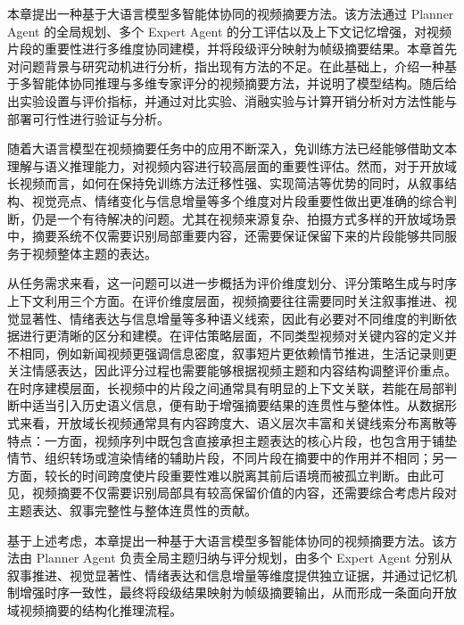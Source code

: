 

本章提出一种基于大语言模型多智能体协同的视频摘要方法。该方法通过 Planner Agent 的全局规划、多个 Expert Agent 的分工评估以及上下文记忆增强，对视频片段的重要性进行多维度协同建模，并将段级评分映射为帧级摘要结果。本章首先对问题背景与研究动机进行分析，指出现有方法的不足。在此基础上，介绍一种基于多智能体协同推理与多维专家评分的视频摘要方法，并说明了模型结构。随后给出实验设置与评价指标，并通过对比实验、消融实验与计算开销分析对方法性能与部署可行性进行验证与分析。


随着大语言模型在视频摘要任务中的应用不断深入，免训练方法已经能够借助文本理解与语义推理能力，对视频内容进行较高层面的重要性评估。然而，对于开放域长视频而言，如何在保持免训练方法迁移性强、实现简洁等优势的同时，从叙事结构、视觉亮点、情绪变化与信息增量等多个维度对片段重要性做出更准确的综合判断，仍是一个有待解决的问题。尤其在视频来源复杂、拍摄方式多样的开放域场景中，摘要系统不仅需要识别局部重要内容，还需要保证保留下来的片段能够共同服务于视频整体主题的表达。

从任务需求来看，这一问题可以进一步概括为评价维度划分、评分策略生成与时序上下文利用三个方面。在评价维度层面，视频摘要往往需要同时关注叙事推进、视觉显著性、情绪表达与信息增量等多种语义线索，因此有必要对不同维度的判断依据进行更清晰的区分和建模。在评估策略层面，不同类型视频对关键内容的定义并不相同，例如新闻视频更强调信息密度，叙事短片更依赖情节推进，生活记录则更关注情感表达，因此评分过程也需要能够根据视频主题和内容结构调整评价重点。在时序建模层面，长视频中的片段之间通常具有明显的上下文关联，若能在局部判断中适当引入历史语义信息，便有助于增强摘要结果的连贯性与整体性。从数据形式来看，开放域长视频通常具有内容跨度大、语义层次丰富和关键线索分布离散等特点：一方面，视频序列中既包含直接承担主题表达的核心片段，也包含用于铺垫情节、组织转场或渲染情绪的辅助片段，不同片段在摘要中的作用并不相同；另一方面，较长的时间跨度使片段重要性难以脱离其前后语境而被孤立判断。由此可见，视频摘要不仅需要识别局部具有较高保留价值的内容，还需要综合考虑片段对主题表达、叙事完整性与整体连贯性的贡献。

基于上述考虑，本章提出一种基于大语言模型多智能体协同的视频摘要方法。该方法由 Planner Agent 负责全局主题归纳与评分规划，由多个 Expert Agent 分别从叙事推进、视觉显著性、情绪表达和信息增量等维度提供独立证据，并通过记忆机制增强时序一致性，最终将段级结果映射为帧级摘要输出，从而形成一条面向开放域视频摘要的结构化推理流程。

